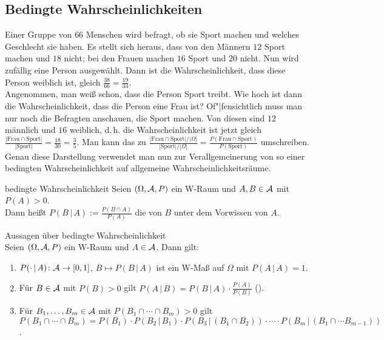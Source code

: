 \subsection{%
    Bedingte Wahrscheinlichkeiten%
}

\begin{Bsp}
    Einer Gruppe von $66$ Menschen wird befragt, ob sie Sport machen und
    welches Geschlecht sie haben.
    Es stellt sich heraus, dass von den Männern $12$ Sport machen und $18$ nicht;
    bei den Frauen machen $16$ Sport und $20$ nicht.
    Nun wird zufällig eine Person ausgewählt.
    Dann ist die Wahrscheinlichkeit, dass diese Person weiblich ist, gleich
    $\frac{38}{66} = \frac{19}{33}$.\\
    Angenommen, man weiß schon, dass die Person Sport treibt.
    Wie hoch ist dann die Wahrscheinlichkeit, dass die Person eine Frau ist?
    Of"|fensichtlich muss man nur noch die Befragten anschauen, die Sport machen.
    Von diesen sind $12$ männlich und $16$ weiblich, d.\,h. die Wahrscheinlichkeit ist jetzt
    gleich $\frac{|\text{Frau} \cap \text{Sport}|}{|\text{Sport}|} = \frac{18}{30} = \frac{3}{5}$.
    Man kann das zu $\frac{|\text{Frau} \cap \text{Sport}|/|\Omega|}{|\text{Sport}|/|\Omega|} =
    \frac{P(\text{Frau} \cap \text{Sport})}{P(\text{Sport})}$ umschreiben.
    Genau diese Darstellung verwendet man nun zur Verallgemeinerung von so einer
    bedingten Wahrscheinlichkeit auf allgemeine Wahrscheinlichkeitsräume.
\end{Bsp}

\linie

\begin{Def}{bedingte Wahrscheinlichkeit}
    Seien $(\Omega, \mathcal{A}, P)$ ein W-Raum und $A, B \in \mathcal{A}$ mit $P(A) > 0$.\\
    Dann heißt $P(B \,|\, A) := \frac{P(B \cap A)}{P(A)}$ die 
    von $B$ unter dem Vorwissen von $A$.
\end{Def}

\begin{Satz}{Aussagen über bedingte Wahrscheinlichkeit}\\
    Seien $(\Omega, \mathcal{A}, P)$ ein W-Raum und $A \in \mathcal{A}$.
    Dann gilt:
    \begin{enumerate}
        \item
        $P(\cdot \,|\, A)\colon \mathcal{A} \rightarrow [0, 1]$, $B \mapsto P(B \,|\, A)$ ist ein W-Maß
        auf $\Omega$ mit $P(A \,|\, A) = 1$.
        
        \item
        Für $B \in \mathcal{A}$ mit $P(B) > 0$ gilt
        $P(A \,|\, B) = P(B \,|\, A) \cdot \frac{P(A)}{P(B)}$
        ().
        
        \item
        Für $B_1, \dotsc, B_m \in \mathcal{A}$ mit $P(B_1 \cap \dotsb \cap B_m) > 0$ gilt\\
        $P(B_1 \cap \dotsb \cap B_m) = P(B_1) \cdot P(B_2 \,|\, B_1) \cdot
        P(B_3 \,|\, (B_1 \cap B_2)) \cdot \dotsm \cdot
        P(B_m \,|\, (B_1 \cap \dotsb B_{m-1}))$.
    \end{enumerate}
\end{Satz}

